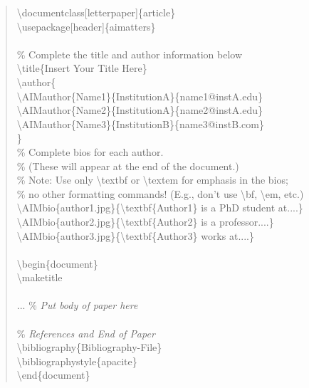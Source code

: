 \documentclass[letterpaper]{article}
\begin{document}
\begin{quote}
\begin{tiny}
\textbackslash documentclass[letterpaper]\{article\}\\
\textbackslash usepackage[header]\{aimatters\}\\
\\
\% Complete the title and author information below\\
\textbackslash title\{Insert Your Title Here\}\\
\textbackslash author\{\\
\textbackslash AIMauthor\{Name1\}\{InstitutionA\}\{name1@instA.edu\}\\
\textbackslash AIMauthor\{Name2\}\{InstitutionA\}\{name2@instA.edu\}\\
\textbackslash AIMauthor\{Name3\}\{InstitutionB\}\{name3@instB.com\}\\
\}\\
\% Complete bios for each author.\\
\% (These will appear at the end of the document.)\\
\% Note:  Use only \textbackslash textbf or \textbackslash textem for emphasis in the bios;\\
\% no other formatting commands!  (E.g., don't use \textbackslash bf, \textbackslash em, etc.)\\
\textbackslash AIMbio\{author1.jpg\}\{\textbackslash textbf\{Author1\} is a PhD student at....\}\\
\textbackslash AIMbio\{author2.jpg\}\{\textbackslash textbf\{Author2\} is a professor....\}\\
\textbackslash AIMbio\{author3.jpg\}\{\textbackslash textbf\{Author3\} works at....\}\\
\\
\textbackslash begin\{document\}\\
\textbackslash maketitle\\
\\
... \% \textit{Put body of paper here}\\
\\
\% \textit{References and End of Paper}\\
\textbackslash bibliography\{Bibliography-File\}\\
\textbackslash bibliographystyle\{apacite\}\\
\textbackslash end\{document\}
\end{tiny}
\end{quote}
\end{document}
